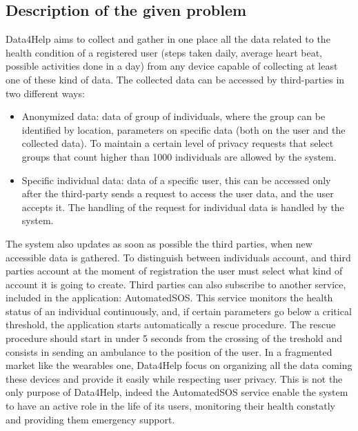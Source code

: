 \subsection{Description of the given problem}
Data4Help aims to collect and gather in one place all the data related to the health condition of a registered user (steps taken daily, average heart beat, possible activities done in a day) from any device capable of collecting at least one of these kind of data.
The collected data can be accessed by third-parties in two different ways:
\begin{itemize}
\item Anonymized data: data of group of individuals, where the group can be identified by location, parameters on specific data (both on the user and the collected data). To maintain a certain level of privacy requests that select groups that count higher than 1000 individuals are allowed by the system.
\item Specific individual data: data of a specific user, this can be accessed only after the third-party sends a request to access the user data, and the user accepts it. The handling of the request for individual data is handled by the system.
\end{itemize}
The system also updates as soon as possible the third parties, when new accessible data is gathered.
To distinguish between individuals account, and third parties account at the moment of registration the user must select what kind of account it is going to create.
Third parties can also subscribe to another service, included in the application: AutomatedSOS. This service monitors the health status of an individual continuously, and, if certain parameters go below a critical threshold, the application starts automatically a rescue procedure. The rescue procedure should start in under 5 seconds from the crossing of the treshold and consists in sending an ambulance to the position of the user.
\newline
In a fragmented market like the wearables one, Data4Help focus on organizing all the data coming these devices and provide it easily while respecting user privacy.
 \newline
This is not the only purpose of Data4Help, indeed the AutomatedSOS service enable the system to have an active role in the life of its users, monitoring their health constatly and providing them emergency support.
